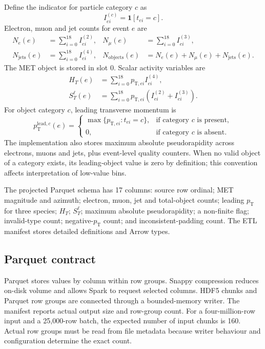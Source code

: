 \documentclass[11pt,a4paper]{article}
\newcommand{\pt}{p_{\mathrm{T}}}
\newcommand{\HT}{H_{T}}
\newcommand{\STlep}{S_{T}^{\ell}}
\newcommand{\njet}{N_{\mathrm{jets}}}
\begin{document}
Define the indicator for particle category \(c\) as
\begin{equation}I_{ei}^{(c)}=\mathbf{1}[t_{ei}=c].\end{equation}
Electron, muon and jet counts for event \(e\) are
\begin{align}
N_e(e)&=\sum_{i=0}^{18}I_{ei}^{(2)}, & N_\mu(e)&=\sum_{i=0}^{18}I_{ei}^{(3)},\\
\njet(e)&=\sum_{i=0}^{18}I_{ei}^{(4)}, & N_{\mathrm{objects}}(e)&=N_e(e)+N_\mu(e)+\njet(e).
\end{align}
The MET object is stored in slot 0. Scalar activity variables are
\begin{align}
\HT(e)&=\sum_{i=0}^{18}p_{\mathrm{T},ei}I_{ei}^{(4)},\\
\STlep(e)&=\sum_{i=0}^{18}p_{\mathrm{T},ei}\left(I_{ei}^{(2)}+I_{ei}^{(3)}\right).
\end{align}
For object category \(c\), leading transverse momentum is
\begin{equation}
\pt^{\mathrm{lead},c}(e)=\begin{cases}\max\{p_{\mathrm{T},ei}:t_{ei}=c\},&\text{if category }c\text{ is present},\\0,&\text{if category }c\text{ is absent}.\end{cases}
\end{equation}
The implementation also stores maximum absolute pseudorapidity across electrons, muons and jets, plus event-level quality counters. When no valid object of a category exists, its leading-object value is zero by definition; this convention affects interpretation of low-value bins.

The projected Parquet schema has 17 columns: source row ordinal; MET magnitude and azimuth; electron, muon, jet and total-object counts; leading \(\pt\) for three species; \(\HT\); \(\STlep\); maximum absolute pseudorapidity; a non-finite flag; invalid-type count; negative-\(\pt\) count; and inconsistent-padding count. The ETL manifest stores detailed definitions and Arrow types.

\subsection{Parquet contract}

Parquet stores values by column within row groups. Snappy compression reduces on-disk volume and allows Spark to request selected columns. HDF5 chunks and Parquet row groups are connected through a bounded-memory writer. The manifest reports actual output size and row-group count. For a four-million-row input and a 25,000-row batch, the expected number of input chunks is 160. Actual row groups must be read from file metadata because writer behaviour and configuration determine the exact count.
\end{document}
